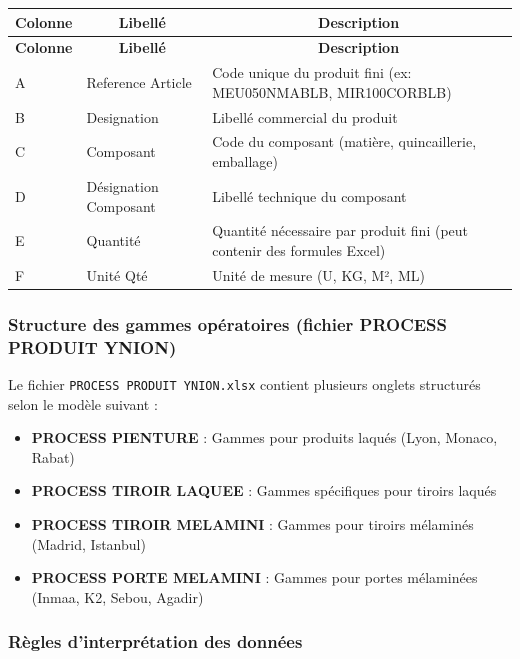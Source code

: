 \documentclass[12pt,a4paper]{article}
\begin{document}
\begin{longtable}{|p{3cm}|p{4cm}|p{8cm}|}
\hline
\multicolumn{1}{|c|}{\textbf{Colonne}} & \multicolumn{1}{c|}{\textbf{Libellé}} & \multicolumn{1}{c|}{\textbf{Description}} \\
\hline
\endfirsthead
\hline
\multicolumn{1}{|c|}{\textbf{Colonne}} & \multicolumn{1}{c|}{\textbf{Libellé}} & \multicolumn{1}{c|}{\textbf{Description}} \\
\hline
\endhead
\hline
\endfoot
A & Reference Article & Code unique du produit fini (ex: MEU050NMABLB, MIR100CORBLB) \\
B & Designation & Libellé commercial du produit \\
C & Composant & Code du composant (matière, quincaillerie, emballage) \\
D & Désignation Composant & Libellé technique du composant \\
E & Quantité & Quantité nécessaire par produit fini (peut contenir des formules Excel) \\
F & Unité Qté & Unité de mesure (U, KG, M², ML) \\
\hline
\end{longtable}

\subsubsection{Structure des gammes opératoires (fichier PROCESS PRODUIT YNION)}

Le fichier \texttt{PROCESS PRODUIT YNION.xlsx} contient plusieurs onglets structurés selon le modèle suivant :

\begin{itemize}
    \item \textbf{PROCESS PIENTURE} : Gammes pour produits laqués (Lyon, Monaco, Rabat)
    \item \textbf{PROCESS TIROIR LAQUEE} : Gammes spécifiques pour tiroirs laqués
    \item \textbf{PROCESS TIROIR MELAMINI} : Gammes pour tiroirs mélaminés (Madrid, Istanbul)
    \item \textbf{PROCESS PORTE MELAMINI} : Gammes pour portes mélaminées (Inmaa, K2, Sebou, Agadir)
\end{itemize}

\subsubsection{Règles d'interprétation des données}
\end{document}

